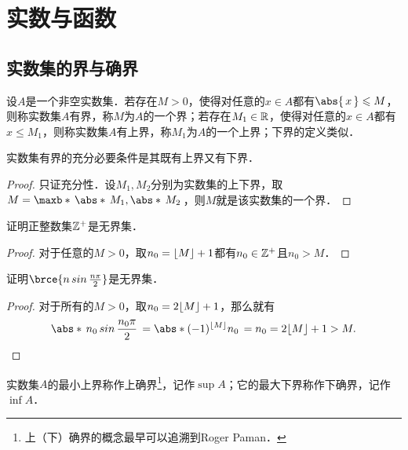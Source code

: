 \chapter{实数与函数}

\section{实数集的界与确界}

\begin{definition}
  \label{defn:bnd}
  设\(A\)是一个非空实数集．若存在\(M > 0\)，使得对任意的\(x \in A\)都有\(\abs{\,x\,} \le M\)，则称实数集\(A\)有界，称\(M\)为\(A\)的一个界；若存在\(M_1 \in \mathbb{R}\)，使得对任意的\(x \in A\)都有\(x \le M_1\)，则称实数集\(A\)有上界，称\(M_1\)为\(A\)的一个上界；下界的定义类似．
\end{definition}

\begin{theorem*}
  实数集有界的充分必要条件是其既有上界又有下界．

  \begin{proof}
    只证充分性．设\(M_1, M_2\)分别为实数集的上下界，取\(M = \maxb*{\,\abs*{\,M_1}, \abs*{\,M_2}\,}\)，则\(M\)就是该实数集的一个界．
  \end{proof}
\end{theorem*}

\begin{example*}
  证明正整数集\(\mathbb{Z}^+\)是无界集．

  \begin{proof}
    对于任意的\(M > 0\)，取\(n_0 = \lfloor M\rfloor + 1\)都有\(n_0 \in \mathbb{Z}^+\)且\(n_0 > M\)．
  \end{proof}
\end{example*}


\begin{example*}
  证明\(\brce{n \sin \frac{n\pi}2}\)是无界集．

  \begin{proof}
    对于所有的\(M > 0\)，取\(n_0 = 2 \lfloor M\rfloor + 1\)，那么就有
    \[
      \abs*{\,n_0 \sin \frac{n_0\pi}2\,} = \abs*{(-1)^{\floor M} n_0\,} = n_0 = 2 \floor M + 1 > M. \qedhere
    \]
  \end{proof}
\end{example*}

\begin{definition*}
  实数集\(A\)的最小上界称作上确界\footnote{上（下）确界的概念最早可以追溯到Roger Paman\cite{PamanBio}．}，记作\(\sup A\)；它的最大下界称作下确界，记作\(\inf A\)．
\end{definition*}

